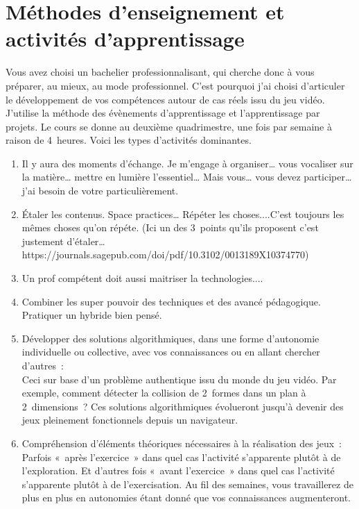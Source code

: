 \section{Méthodes d’enseignement et activités d’apprentissage}
Vous avez choisi un bachelier professionnalisant, qui cherche donc à vous préparer, au mieux, au mode professionnel. C’est  pourquoi j’ai choisi d’articuler le développement de vos compétences autour de cas réels issu du jeu vidéo. J'utilise la méthode des évènements d’apprentissage\cite{Leclercqevenements} et l'apprentissage par projets\cite{proulx2004apprentissage}.
Le cours se donne au deuxième quadrimestre, une fois par semaine à raison de 4~heures. Voici les types d'activités dominantes.
\begin{enumerate}
    \item Il y aura des moments d'échange. Je m'engage à organiser… vous vocaliser sur la matière… mettre en lumière l'essentiel… Mais vous… vous devez participer… j'ai besoin de votre particulièrement.
    \item Étaler les contenus. Space practices… Répéter les choses....C'est toujours les mêmes choses qu'on répéte. (Ici un des 3~points qu'ils proposent c'est justement d'étaler… https://journals.sagepub.com/doi/pdf/10.3102/0013189X10374770)
    \item Un prof compétent doit aussi maitriser la technologies....
    \item Combiner les super pouvoir des techniques et des avancé pédagogique. Pratiquer un hybride bien pensé.
    \item Développer des solutions algorithmiques, dans une forme d’autonomie individuelle ou collective, avec vos connaissances ou en allant chercher d’autres~:\\Ceci sur base d’un problème authentique issu du monde du jeu vidéo. Par exemple, comment détecter la collision de 2~formes dans un plan à 2~dimensions~? Ces solutions algorithmiques évolueront jusqu'à devenir des jeux pleinement fonctionnels depuis un navigateur.
    \item Compréhension d'éléments théoriques nécessaires à la réalisation des jeux~:\\Parfois «~après l’exercice~» dans quel cas l’activité s’apparente plutôt à de l’exploration. Et d’autres fois «~avant l’exercice~» dans quel cas l’activité s’apparente plutôt à de l’exercisation. Au fil des semaines, vous travaillerez de plus en plus en autonomies étant donné que vos connaissances augmenteront.

\end{enumerate}
